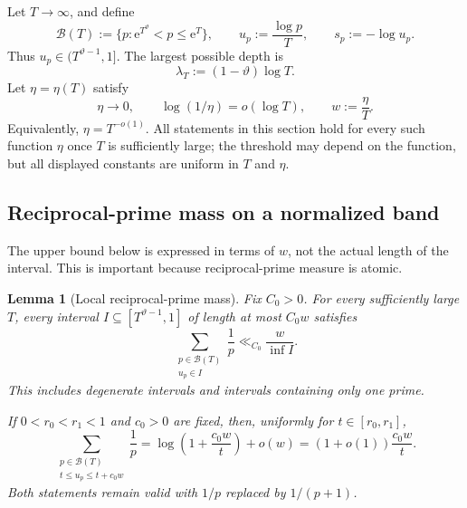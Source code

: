 \documentclass[11pt]{article}
\numberwithin{equation}{section}
\theoremstyle{plain}
\newtheorem{lemma}[theorem]{Lemma}
\newcommand{\1}{\mathbf 1}
\newcommand{\e}{\mathrm e}
\newcommand{\cB}{\mathcal B}
\begin{document}
Let $T\to\infty$, and define
\begin{equation}\label{eq:band-definitions}
 \cB(T):=\{p:\e^{T^\vartheta}<p\le\e^T\},
 \qquad
 u_p:=\frac{\log p}{T},
 \qquad
 s_p:=-\log u_p.
\end{equation}
Thus $u_p\in(T^{\vartheta-1},1]$.  The largest possible depth is
\begin{equation}\label{eq:horizon}
 \lambda_T:=(1-\vartheta)\log T.
\end{equation}
Let $\eta=\eta(T)$ satisfy
\begin{equation}\label{eq:slow-eta}
 \eta\longrightarrow0,
 \qquad
 \log(1/\eta)=o(\log T),
 \qquad
 w:=\frac{\eta}{T}.
\end{equation}
Equivalently, $\eta=T^{-o(1)}$.  All statements in this section hold for
every such function $\eta$ once $T$ is sufficiently large; the threshold
may depend on the function, but all displayed constants are uniform in
$T$ and $\eta$.

\subsection{Reciprocal-prime mass on a normalized band}

The upper bound below is expressed in terms of $w$, not the actual length
of the interval.  This is important because reciprocal-prime measure is
atomic.

\begin{lemma}[Local reciprocal-prime mass]\label{lem:local-prime-mass}
Fix $C_0>0$.  For every sufficiently large $T$, every interval
$I\subseteq[T^{\vartheta-1},1]$ of length at most $C_0w$ satisfies
\begin{equation}\label{eq:local-upper}
 \sum_{\substack{p\in\cB(T)\\u_p\in I}}\frac1p
 \ll_{C_0}\frac{w}{\inf I}.
\end{equation}
This includes degenerate intervals and intervals containing only one prime.

If $0<r_0<r_1<1$ and $c_0>0$ are fixed, then, uniformly for
$t\in[r_0,r_1]$,
\begin{equation}\label{eq:local-lower}
 \sum_{\substack{p\in\cB(T)\\t\le u_p\le t+c_0w}}\frac1p
 =\log\!\left(1+\frac{c_0w}{t}\right)+o(w)
 =(1+o(1))\frac{c_0w}{t}.
\end{equation}
Both statements remain valid with $1/p$ replaced by $1/(p+1)$.
\end{lemma}
\end{document}
